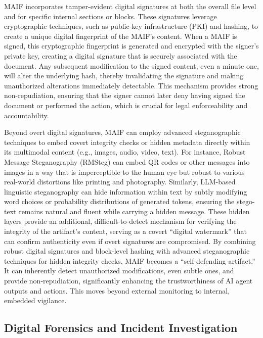 \documentclass[conference]{IEEEtran}
\begin{document}
MAIF incorporates tamper-evident digital signatures at both the overall file level and for specific internal sections or blocks\cite{ref65}. These signatures leverage cryptographic techniques, such as public-key infrastructure (PKI) and hashing, to create a unique digital fingerprint of the MAIF's content\cite{ref99}. When a MAIF is signed, this cryptographic fingerprint is generated and encrypted with the signer's private key, creating a digital signature that is securely associated with the document\cite{ref99}. Any subsequent modification to the signed content, even a minute one, will alter the underlying hash, thereby invalidating the signature and making unauthorized alterations immediately detectable\cite{ref65}. This mechanism provides strong non-repudiation, ensuring that the signer cannot later deny having signed the document or performed the action, which is crucial for legal enforceability and accountability\cite{ref65}.

Beyond overt digital signatures, MAIF can employ advanced steganographic techniques to embed covert integrity checks or hidden metadata directly within its multimodal content (e.g., images, audio, video, text)\cite{ref73}. For instance, Robust Message Steganography (RMSteg) can embed QR codes or other messages into images in a way that is imperceptible to the human eye but robust to various real-world distortions like printing and photography\cite{ref102}. Similarly, LLM-based linguistic steganography can hide information within text by subtly modifying word choices or probability distributions of generated tokens, ensuring the stego-text remains natural and fluent while carrying a hidden message\cite{ref104}. These hidden layers provide an additional, difficult-to-detect mechanism for verifying the integrity of the artifact's content, serving as a covert ``digital watermark'' that can confirm authenticity even if overt signatures are compromised. By combining robust digital signatures and block-level hashing with advanced steganographic techniques for hidden integrity checks, MAIF becomes a ``self-defending artifact.'' It can inherently detect unauthorized modifications, even subtle ones, and provide non-repudiation, significantly enhancing the trustworthiness of AI agent outputs and actions. This moves beyond external monitoring to internal, embedded vigilance.

\subsection{Digital Forensics and Incident Investigation}
\end{document}

